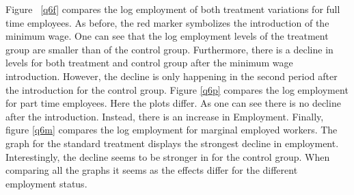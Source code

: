 \documentclass[a4paper]{article}
\begin{document}
{Figure ~\ref{q6f} compares the log employment of both treatment variations for full time employees. As before, the red marker symbolizes the introduction of the minimum wage. One can see that the log employment levels of the treatment group are smaller than of the control group. Furthermore, there is a decline in levels for both treatment and control group after the minimum wage introduction. However, the decline is only happening in the second period after the introduction for the control group.
\newline
Figure \ref{q6p} compares the log employment for part time employees. Here the plots differ. As one can see there is no decline after the introduction. Instead, there is an increase in Employment.
\newline
Finally, figure \ref{q6m} compares the log employment for marginal employed workers. The graph for the standard treatment displays the strongest decline in employment. Interestingly, the decline seems to be stronger in for the control group.
When comparing all the graphs it seems as the effects differ for the different employment status.


}
\end{document}
